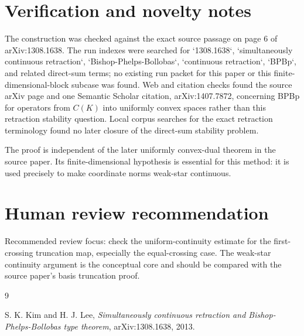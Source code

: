 \documentclass[11pt]{article}
\begin{document}
\section*{Verification and novelty notes}

The construction was checked against the exact source passage on page 6 of
arXiv:1308.1638.  The run indexes were searched for `1308.1638`,
`simultaneously continuous retraction`, `Bishop-Phelps-Bollobas`,
`continuous retraction`, `BPBp`, and related direct-sum terms; no existing run
packet for this paper or this finite-dimensional-block subcase was found.
Web and citation checks found the source arXiv page and one Semantic Scholar
citation, arXiv:1407.7872, concerning BPBp for operators from \(C(K)\) into
uniformly convex spaces rather than this retraction stability question.  Local
corpus searches for the exact retraction terminology found no later closure of
the direct-sum stability problem.

The proof is independent of the later uniformly convex-dual theorem in the
source paper.  Its finite-dimensional hypothesis is essential for this method:
it is used precisely to make coordinate norms weak-star continuous.

\section*{Human review recommendation}

Recommended review focus: check the uniform-continuity estimate for the
first-crossing truncation map, especially the equal-crossing case.  The
weak-star continuity argument is the conceptual core and should be compared
with the source paper's basis truncation proof.

\begin{thebibliography}{9}

S. K. Kim and H. J. Lee,
\emph{Simultaneously continuous retraction and Bishop-Phelps-Bollobas type
theorem}, arXiv:1308.1638, 2013.

\end{thebibliography}
\end{document}
